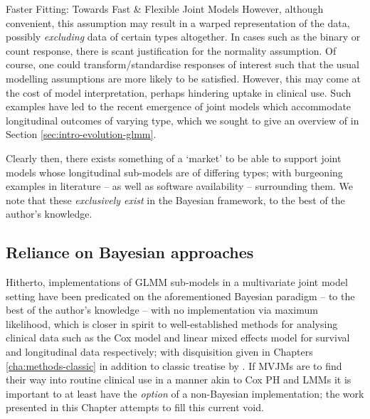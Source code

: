 \begin{chapter}{\label{cha:flexible}Faster Fitting: Towards Fast \& Flexible Joint Models}
However, although convenient, this assumption may result in a warped representation of the data, possibly \textit{excluding} data of certain types altogether. In cases such as the binary or count response, there is scant justification for the normality assumption. Of course, one could transform/standardise responses of interest such that the usual modelling assumptions are more likely to be satisfied. However, this may come at the cost of model interpretation, perhaps hindering uptake in clinical use. Such examples have led to the recent emergence of joint models which accommodate longitudinal outcomes of varying type, which we sought to give an overview of in Section \ref{sec:intro-evolution-glmm}.

Clearly then, there exists something of a `market' to be able to support joint models whose longitudinal sub-models are of differing types; with burgeoning examples in literature -- as well as software availability -- surrounding them. We note that these \textit{exclusively exist} in the Bayesian framework, to the best of the author's knowledge.

\subsection{Reliance on Bayesian approaches}\label{sec:flexible-intro-bayes}
Hitherto, implementations of GLMM sub-models in a multivariate joint model setting have been predicated on the aforementioned Bayesian paradigm -- to the best of the author's knowledge -- with no implementation via maximum likelihood, which is closer in spirit to well-established methods for analysing clinical data such as the Cox model and linear mixed effects model for survival and longitudinal data respectively; with disquisition given in Chapters \ref{cha:methods-classic} in addition to classic treatise by \citet{JMOverview}. If MVJMs are to find their way into routine clinical use in a manner akin to Cox PH and LMMs it is important to at least have the \textit{option} of a non-Bayesian implementation; the work presented in this Chapter attempts to fill this current void. 


\end{chapter}
